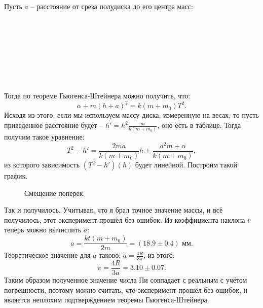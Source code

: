 \documentclass[a4paper, 12pt]{article}%
\begin{document}
Пусть $a$ -- расстояние от среза полудиска до его центра масс:
\\ \\ \\ \\ \\ \\ \\ \\ \\
Тогда по теореме Гьюгенса-Штейнера можно получить, что:
\[\alpha+m(h+a)^2=k(m+m_0)T^2.\]
Исходя из этого, если мы используем массу диска, измеренную на весах, то пусть приведенное расстояние будет -- $h'=h^2\frac{m}{k(m+m_0)}$, оно есть в таблице. Тогда получим такое уравнение:
\[T^2-h'=\dfrac{2ma}{k(m+m_0)}h+\dfrac{a^2m+\alpha}{k(m+m_0)},\]
из которого зависимость $(T^2-h')(h)$ будет линейной. Построим такой график.

\begin{figure}[h!]
\caption{Смещение поперек.}
\end{figure}

Так и получилось. Учитывая, что я брал точное значение массы, и всё получилось, этот эксперимент прошёл без ошибок. Из коэффициента наклона $t$ теперь можно вычислить $a$:
\[a=\dfrac{kt(m+m_0)}{2m}=(18.9\pm0.4)\text{ мм}.\]
Теоретическое значение для $a$ таково: $a=\frac{4R}{3\pi}$, из этого:
\[\pi=\frac{4R}{3a}=3.10\pm0.07.\]
Таким образом полученное значение числа Пи совпадает с реальным с учётом погрешности, поэтому можно считать, что эксперимент прошёл без ошибок, и является неплохим подтверждением теоремы Гьюгенса-Штейнера. 
\end{document}
